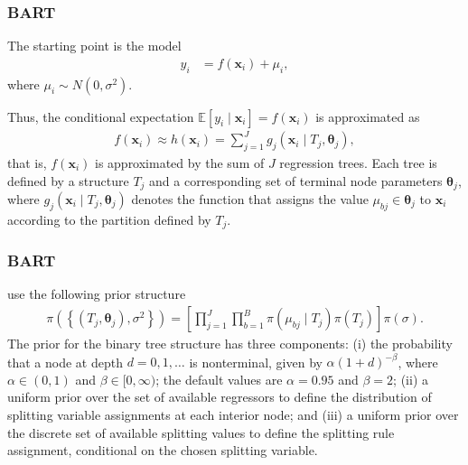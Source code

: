 \documentclass[12pt, compress]{beamer}
\begin{document}
\begin{frame}
	\frametitle{BART}
The starting point is the model
\begin{align*}
	y_i &= f(\mathbf{x}_i) + \mu_i,
\end{align*}
where \( \mu_i \sim N(0, \sigma^2) \).

Thus, the conditional expectation \( \mathbb{E}[y_i \mid \mathbf{x}_i] = f(\mathbf{x}_i) \) is approximated as
\begin{align*}
	f(\mathbf{x}_i) \approx h(\mathbf{x}_i)= \sum_{j=1}^J g_j(\mathbf{x}_i \mid T_j, \boldsymbol{\theta}_j),
\end{align*}
that is, \( f(\mathbf{x}_i) \) is approximated by the sum of \( J \) regression trees. Each tree is defined by a structure \( T_j \) and a corresponding set of terminal node parameters \( \boldsymbol{\theta}_j \), where \( g_j(\mathbf{x}_i \mid T_j, \boldsymbol{\theta}_j) \) denotes the function that assigns the value \( \mu_{bj} \in \boldsymbol{\theta}_j \) to \( \mathbf{x}_i \) according to the partition defined by \( T_j \).

\end{frame}

\begin{frame}
	\frametitle{BART}
\cite{chipman2010bart} use the following prior structure
\begin{align*}
	\pi(\left\{(T_j,\boldsymbol{\theta}_j),\sigma^2\right\})=\left[\prod_{j=1}^J\prod_{b=1}^B\pi(\mu_{bj}\mid T_j)\pi(T_j)\right]\pi(\sigma).
\end{align*}  
The prior for the binary tree structure has three components: (i) the probability that a node at depth \( d = 0, 1, \dots \) is nonterminal, given by \( \alpha(1 + d)^{-\beta} \), where \( \alpha \in (0,1) \) and \( \beta \in [0, \infty) \); the default values are \( \alpha = 0.95 \) and \( \beta = 2 \); (ii) a uniform prior over the set of available regressors to define the distribution of splitting variable assignments at each interior node; and (iii) a uniform prior over the discrete set of available splitting values to define the splitting rule assignment, conditional on the chosen splitting variable.
\end{frame}
\end{document}
